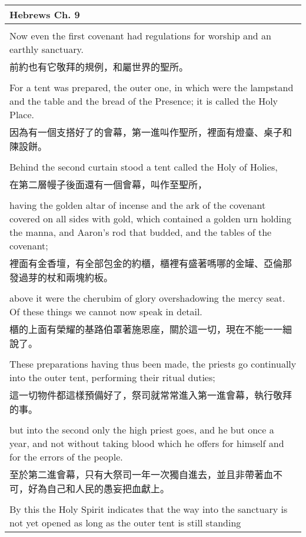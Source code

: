 \newpage
\begin{tabularx}{\textwidth}{p{}}
\hline
Hebrews Ch. 9 \\
\hline \\
Now even the first covenant had regulations for worship and an earthly sanctuary. \\
前約也有它敬拜的規例，和屬世界的聖所。 \\ \\
For a tent was prepared, the outer one, in which were the lampstand and the table and the bread of the Presence; it is called the Holy Place. \\
因為有一個支搭好了的會幕，第一進叫作聖所，裡面有燈臺、桌子和陳設餅。 \\ \\
Behind the second curtain stood a tent called the Holy of Holies, \\
在第二層幔子後面還有一個會幕，叫作至聖所， \\ \\
having the golden altar of incense and the ark of the covenant covered on all sides with gold, which contained a golden urn holding the manna, and Aaron's rod that budded, and the tables of the covenant; \\
裡面有金香壇，有全部包金的約櫃，櫃裡有盛著嗎哪的金罐、亞倫那發過芽的杖和兩塊約板。 \\ \\
above it were the cherubim of glory overshadowing the mercy seat. Of these things we cannot now speak in detail. \\
櫃的上面有榮耀的基路伯罩著施恩座，關於這一切，現在不能一一細說了。 \\ \\
These preparations having thus been made, the priests go continually into the outer tent, performing their ritual duties; \\
這一切物件都這樣預備好了，祭司就常常進入第一進會幕，執行敬拜的事。 \\ \\
but into the second only the high priest goes, and he but once a year, and not without taking blood which he offers for himself and for the errors of the people. \\
至於第二進會幕，只有大祭司一年一次獨自進去，並且非帶著血不可，好為自己和人民的愚妄把血獻上。 \\ \\
By this the Holy Spirit indicates that the way into the sanctuary is not yet opened as long as the outer tent is still standing \\

\end{tabularx}
